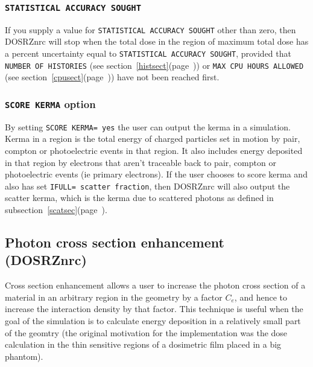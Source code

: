 \documentclass[12pt,twoside]{article}  %
\newcommand{\lpage}[1]{(page~\pageref{#1})}
\newcommand{\note}[1]{\mbox{}\\ \noindent \rule{16cm}{0.5mm} \\
{\em #1} \\ \noindent \rule{16cm}{0.5mm}\\
\typeout{******note: #1 *****}
}
\begin{document}
\subsubsection{{\tt STATISTICAL ACCURACY SOUGHT}}

If you supply a value for {\tt STATISTICAL ACCURACY SOUGHT} other than
zero, then DOSRZnrc will stop when the total dose in the region of
maximum total dose has a percent uncertainty equal to {\tt STATISTICAL
ACCURACY SOUGHT}, provided that {\tt NUMBER OF HISTORIES} (see
section~\ref{histsect}\lpage{histsect}) or {\tt MAX CPU HOURS ALLOWED}
(see section~\ref{cpusect}\lpage{cpusect}) have not been reached first.

\subsubsection{{\tt SCORE KERMA} option}

By setting {\tt SCORE KERMA= yes} the user can output the kerma in
a simulation.  Kerma in a region is the total energy of charged particles
set in motion by pair, compton or photoelectric events in that region.  It
also includes energy deposited in that region by electrons that
aren't traceable back to pair, compton or photoelectric events (ie
primary electrons).  If the user chooses to score kerma and also has
set {\tt IFULL= scatter fraction}, then DOSRZnrc will also output the
scatter kerma, which is the kerma due to scattered photons as defined in
subsection~\ref{scatsec}\lpage{scatsec}.

\subsection{Photon cross section enhancement (DOSRZnrc)}
\label{dosrz_cse}

Cross section enhancement allows a user to increase the photon cross
section of a material in an arbitrary region in the geometry
by a factor $C_e$,
and hence to increase the interaction density by that factor.
This technique is useful when the goal of the simulation is
to calculate energy deposition in a relatively small part
of the geomtry (the original motivation for the implementation
was the dose calculation in the thin sensitive regions of a
dosimetric film placed in a big phantom).
\end{document}
